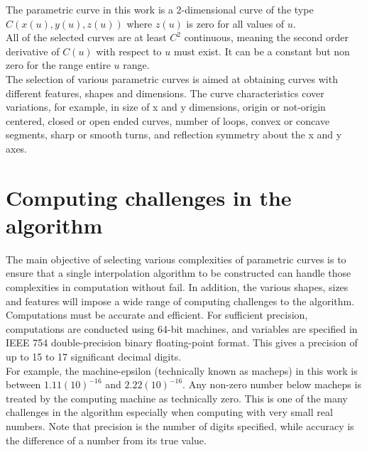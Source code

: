 
The parametric curve in this work is a 2-dimensional curve of the type $C(x(u), y(u), z(u))$ where $z(u)$ is zero for all values of $u$. \\

All of the selected curves are at least $C^{2}$ continuous, meaning the second order derivative of $C(u)$ with respect to $u$ must exist. It can be a constant but non zero for the range entire $u$ range.\\

The selection of various parametric curves is aimed at obtaining curves with different features, shapes and dimensions. The curve characteristics cover variations, for example, in size of x and y dimensions, origin or not-origin centered, closed or open ended curves, number of loops, convex or concave segments, sharp or smooth turns, and reflection symmetry about the x and y axes.


\section{Computing challenges in the algorithm}

The main objective of selecting various complexities of parametric curves is to ensure that a single interpolation algorithm to be constructed can handle those complexities in computation without fail. In addition, the various shapes, sizes and features will impose a wide range of computing challenges to the algorithm.\\

Computations must be accurate and efficient. For sufficient precision, computations are conducted using 64-bit machines, and variables are specified in IEEE 754 double-precision binary floating-point format. This gives a precision of up to 15 to 17 significant decimal digits.\\ 

For example, the machine-epsilon (technically known as macheps) in this work is between $1.11 (10)^{-16}$ and $2.22 (10)^{-16}$. Any non-zero number below macheps  is treated by the computing machine as technically zero. This is one of the many challenges in the algorithm especially when computing with very small real numbers. Note that precision is the number of digits specified, while accuracy is the difference of a number from its true value. \\


